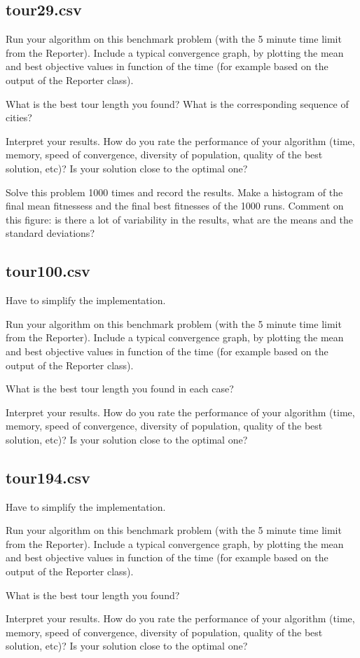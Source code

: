 \documentclass[a4paper,10pt]{article}
\newcommand{\ReplaceMe}[1]{{\color{blue}#1}}
\begin{document}
\subsection{tour29.csv}

\ReplaceMe{Run your algorithm on this benchmark problem (with the 5 minute time limit from the Reporter). Include a typical convergence graph, by plotting the mean and best objective values in function of the time (for example based on the output of the Reporter class). 

What is the best tour length you found? What is the corresponding sequence of cities? 

Interpret your results. How do you rate the performance of your algorithm (time, memory, speed of convergence, diversity of population, quality of the best solution, etc)? Is your solution close to the optimal one?

Solve this problem 1000 times and record the results. Make a histogram of the final mean fitnessess and the final best fitnesses of the 1000 runs. Comment on this figure: is there a lot of variability in the results, what are the means and the standard deviations?}



\subsection{tour100.csv}
Have to simplify the implementation.


\ReplaceMe{Run your algorithm on this benchmark problem (with the 5 minute time limit from the Reporter). Include a typical convergence graph, by plotting the mean and best objective values in function of the time (for example based on the output of the Reporter class). 

What is the best tour length you found in each case? 

Interpret your results. How do you rate the performance of your algorithm (time, memory, speed of convergence, diversity of population, quality of the best solution, etc)? Is your solution close to the optimal one?}

\subsection{tour194.csv}
Have to simplify the implementation.


\ReplaceMe{Run your algorithm on this benchmark problem (with the 5 minute time limit from the Reporter). Include a typical convergence graph, by plotting the mean and best objective values in function of the time (for example based on the output of the Reporter class). 

What is the best tour length you found? 

Interpret your results. How do you rate the performance of your algorithm (time, memory, speed of convergence, diversity of population, quality of the best solution, etc)? Is your solution close to the optimal one?}
\end{document}
